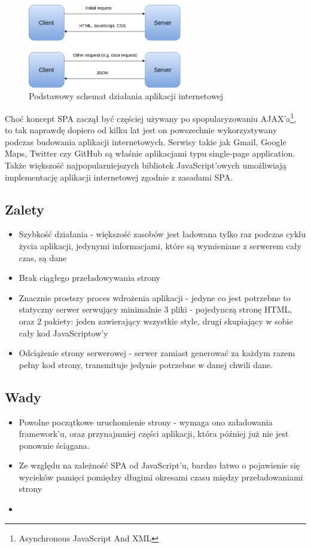 \begin{figure}[h]
	\centering
	\includegraphics[width=0.6\textwidth]{images/spa}
	\caption{Podstawowy schemat działania aplikacji internetowej \cite{MaxCdnWebApp}}
\end{figure}

Choć koncept SPA zaczął być częściej używany po spopularyzowaniu AJAX'a\footnote{Asynchronous JavaScript And XML}, to tak naprawdę dopiero od kilku lat jest on powszechnie wykorzystywany podczas budowania aplikacji internetowych. Serwisy takie jak Gmail, Google Maps, Twitter czy GitHub są właśnie aplikacjami typu single-page application. Także większość najpopularniejszych bibliotek JavaScript'owych umożliwiają implementację aplikacji internetowej zgodnie z zasadami SPA.
\subsection{Zalety}
\begin{itemize}
	\item Szybkość działania - większość zasobów jest ładowana tylko raz podczas cyklu życia aplikacji, jedynymi informacjami, które są wymieniane z serwerem cały czas, są dane
	\item Brak ciągłego przeładowywania strony
	\item Znacznie prostszy proces wdrożenia aplikacji - jedyne co jest potrzebne to statyczny serwer serwujący minimalnie 3 pliki - pojedynczą stronę HTML, oraz 2 pakiety: jeden zawierający wszystkie style, drugi skupiający w sobie cały kod JavaScriptow'y
	\item Odciążenie strony serwerowej - serwer zamiast generować za każdym razem pełny kod strony, transmituje jedynie potrzebne w danej chwili dane.
\end{itemize}
\subsection{Wady}
\begin{itemize}
	\item Powolne początkowe uruchomienie strony - wymaga ono załadowania framework'u, oraz przynajmniej części aplikacji, która później już nie jest ponownie ściągana.
	\item Ze względu na zależność SPA od JavaScript'u, bardzo łatwo o pojawienie się wycieków pamięci pomiędzy długimi okresami czasu między przeładowaniami strony
	\item
\end{itemize}

